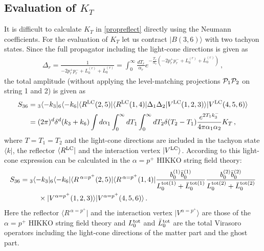 \documentclass[12pt]{article}
\begin{document}
\subsection{Evaluation of $K_T$}
It is difficult to calculate $K_T$ in \eqref{propreflect} directly
using the Neumann coefficients.
For the evaluation of $K_T$ let us contract $|B(3,6)\rangle$ with two
tachyon states.
Since the full propagator including the light-cone directions is given
as
\begin{align}
\Delta_r=\frac{1}{-2p^+_rp^-_r+L_0^{(r)}+\bar L_0^{(r)}}
=\int_0^\infty\frac{dT_r}{\alpha_r}
e^{-\frac{T_r}{\alpha_r}(-2p^+_rp^-_r+L_0^{(r)}+\bar L_0^{(r)})}\,,
\end{align}
the total amplitude (without applying the level-matching projections
${\cal P}_1{\cal P}_2$ on string 1 and 2) is given as
\begin{align}
S_{36}&={}_3\langle-k_3|{}_6\langle-k_6|
\langle R^{{\rm LC}}(2,5)|\langle R^{{\rm LC}}(1,4)|
\Delta_1\Delta_2
|V^{{\rm LC}}(1,2,3)\rangle
|V^{{\rm LC}}(4,5,6)\rangle
\nonumber\\
&=(2\pi)^d\delta^d(k_3+k_6)\int d\alpha_1
\int_0^\infty dT_1\int_0^\infty dT_2\delta(T_2-T_1)
\frac{e^{2T_1k_3^-}}{4\pi\alpha_1\alpha_2}K_T\,,
\label{eq:det_eval}
\end{align}
where $T=T_1=T_2$ and the light-cone directions are included in the
tachyon state $\langle k|$, the reflector $\langle R^{{\rm LC}}|$ and
the interaction vertex $|V^{{\rm LC}}\rangle$.
According to \cite{KZ} this light-cone expression can be calculated in
the $\alpha=p^+$ HIKKO string field theory:
\begin{align}
&S_{36}={}_3\langle -k_3|{}_6\langle -k_6|
\langle R^{\,\alpha=p^+}(2,5)|\langle R^{\,\alpha=p^+}(1,4)|
\frac{b_0^{(1)}\bar b_0^{(1)}}
{L_0^{{\rm tot}(1)}+\bar L_0^{{\rm tot}(1)}}
\frac{b_0^{(2)}\bar b_0^{(2)}}
{L_0^{{\rm tot}(2)}+\bar L_0^{{\rm tot}(2)}}\nonumber\\
&\qquad\qquad\times
|V^{\alpha=p^+}(1,2,3)\rangle
|V^{\alpha=p^+}(4,5,6)\rangle\,.
\label{alpha=p+}
\end{align}
Here the reflector $\langle R^{\,\alpha=p^+}|$ and the interaction
vertex $|V^{\alpha=p^+}\rangle$ are those of the $\alpha=p^+$ HIKKO
string field theory and $L_0^{{\rm tot}}$ and $\bar L_0^{{\rm tot}}$
are the total Virasoro operators including the light-cone directions
of the matter part and the ghost part.
\end{document}
